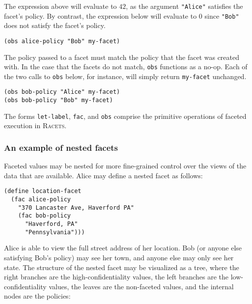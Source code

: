 \documentclass{article}
\begin{document}
The expression above will evaluate to $42$, as the argument \texttt{"Alice"} satisfies the facet's policy. By contrast, the expression below will evaluate to $0$ since \texttt{"Bob"} does not satisfy the facet's policy.

\begin{lstlisting}
(obs alice-policy "Bob" my-facet)
\end{lstlisting}

The policy passed to a facet must match the policy that the facet was created with. In the case that the facets do not match, \texttt{obs} functions as a no-op. Each of the two calls to \texttt{obs} below, for instance, will simply return \texttt{my-facet} unchanged.

\begin{lstlisting}
(obs bob-policy "Alice" my-facet)
(obs bob-policy "Bob" my-facet)
\end{lstlisting}

The forms \texttt{let-label}, \texttt{fac}, and \texttt{obs} comprise the primitive operations of faceted execution in \textsc{Racets}.

\subsubsection{An example of nested facets}
Faceted values may be nested for more fine-grained control over the views of the data that are available. Alice may define a nested facet as follows:

\begin{lstlisting}
(define location-facet
  (fac alice-policy
    "370 Lancaster Ave, Haverford PA"
    (fac bob-policy
      "Haverford, PA"
      "Pennsylvania")))
\end{lstlisting}

Alice is able to view the full street address of her location. Bob (or anyone else satisfying Bob's policy) may see her town, and anyone else may only see her state. The structure of the nested facet may be visualized as a tree, where the right branches are the high-confidentiality values, the left branches are the low-confidentiality values, the leaves are the non-faceted values, and the internal nodes are the policies:

\begin{center}
\end{center}
\end{document}
